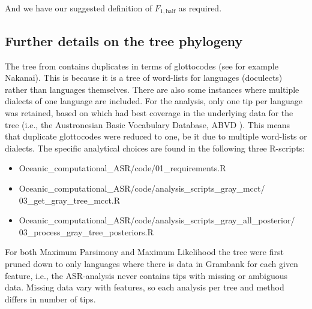 \documentclass[12pt,letterpaper]{article}
\begin{document}
\noindent And we have our suggested definition of $F_{1,\text{half}}$ as required.

\FloatBarrier


%


\subsection{Further details on the tree phylogeny}
\label{supp:tree_details}

The tree from \citet{grayetal_2009} contains duplicates in terms of glottocodes (see for example Nakanai). This is because it is a tree of word-lists for languages (doculects) rather than languages themselves. There are also some instances where multiple dialects of one language are included. For the analysis, only one tip per language was retained, based on which had best coverage in the underlying data for the tree (i.e., the Austronesian Basic Vocabulary Database, ABVD \citep{ABVD}). This means that duplicate glottocodes were reduced to one, be it due to multiple word-lists or dialects. The specific analytical choices are found in the following three R-scripts:

\begin{itemize}
\item Oceanic\_computational\_ASR/code/01\_requirements.R
\item Oceanic\_computational\_ASR/code/analysis\_scripts\_gray\_mcct/\\03\_get\_gray\_tree\_mcct.R
\item Oceanic\_computational\_ASR/code/analysis\_scripts\_gray\_all\_posterior/\\03\_process\_gray\_tree\_posteriors.R
\end{itemize}

For both Maximum Parsimony and Maximum Likelihood the tree were first pruned down to only languages where there is data in Grambank for each given feature, i.e., the ASR-analysis never contains tips with missing or ambiguous data. Missing data vary with features, so each analysis per tree and method differs in number of tips.

\end{document}
